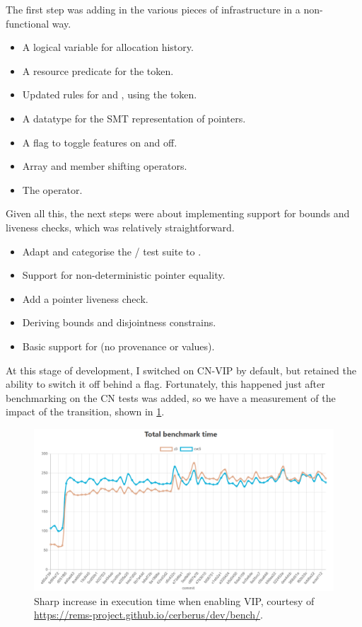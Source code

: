 The first step was adding in the various pieces of infrastructure in a non-functional way.
\begin{itemize}
    \item A logical variable for allocation history.
    \item A resource predicate for the  token.
    \item Updated rules for  and , using the  token.
    \item A datatype for the SMT representation of pointers.
    \item A flag to toggle  features on and off.
    \item Array and member shifting operators.
    \item The  operator.
\end{itemize}

Given all this, the next steps were about implementing support for bounds and
liveness checks, which was relatively straightforward.
\begin{itemize}
    \item Adapt and categorise the / test suite to \@.
    \item Support for non-deterministic pointer equality.
    \item Add a pointer liveness check.
    \item Deriving bounds and disjointness constrains.
    \item Basic support for  (no provenance or
         values).
\end{itemize}

At this stage of development, I switched on CN-VIP by default, but retained the
ability to switch it off behind a flag. Fortunately, this happened just after
benchmarking on the CN tests was added, so we have a measurement of the impact
of the transition, shown in \cref{fig:vip-performance-hit}.

\begin{figure}[h]
    \centering
    \includegraphics[width=\textwidth]{../misc/vip-performance-hit.png}
    \caption{Sharp increase in execution time when enabling VIP, courtesy of
        \url{https://rems-project.github.io/cerberus/dev/bench/}.}\label{fig:vip-performance-hit}
\end{figure}

